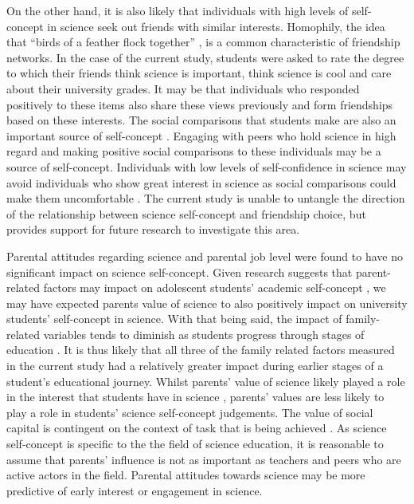 On the other hand, it is also likely that individuals with high levels of self-concept in science seek out friends with similar interests. Homophily, the idea that ``birds of a feather flock together'' \cite{mcpherson2001birds}, is a common characteristic of friendship networks. In the case of the current study, students were asked to rate the degree to which their friends think science is important, think science is cool and care about their university grades. It may be that individuals who responded positively to these items also share these views previously and form friendships based on these interests. The social comparisons that students make are also an important source of self-concept \cite{butz2015salient}. Engaging with peers who hold science in high regard and making positive social comparisons to these individuals may be a source of self-concept. Individuals with low levels of self-confidence in science may avoid individuals who show great interest in science as social comparisons could make them uncomfortable \cite{bong1999comparison}. The current study is unable to untangle the direction of the relationship between science self-concept and friendship choice, but provides support for future research to investigate this area.   

Parental attitudes regarding science and parental job level were found to have no significant impact on science self-concept. Given research suggests that parent-related factors may impact on adolescent students' academic self-concept \cite{fan2010effects}, we may have expected parents value of science to also positively impact on university students' self-concept in science. With that being said, the impact of family-related variables tends to diminish as students progress through stages of education \cite{holm2011dealing}. It is thus likely that all three of the family related factors measured in the current study had a relatively greater impact during earlier stages of a student's educational journey. Whilst parents' value of science likely played a role in the interest that students have in science \cite{archer2013aspires}, parents' values are less likely to play a role in students' science self-concept judgements. The value of social capital is contingent on the context of task that is being achieved \cite{Adler2017}. As science self-concept is specific to the the field of science education, it is reasonable to assume that parents' influence is not as important as teachers and peers who are active actors in the field. Parental attitudes towards science may be more predictive of early interest or engagement in science.  

